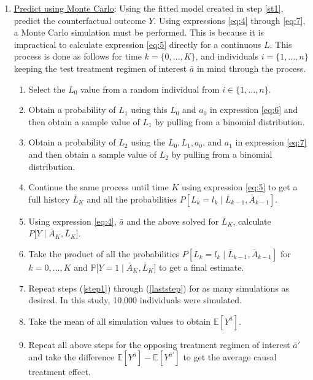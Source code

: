 \begin{enumerate}
\item \underline{Predict using Monte Carlo}: Using the fitted model created in step \ref{st1}, predict the counterfactual outcome $Y$.  Using expressions \ref{eq:4} through \ref{eq:7}, a Monte Carlo simulation must be performed.  This is because it is impractical to calculate expression \ref{eq:5} directly for a continuous $L$.  This process is done as follows for time $k = \{ 0, \dots, K \}$, and individuals $i = \{ 1, \dots, n \}$ keeping the test treatment regimen of interest $\bar{a}$ in mind through the process.  
\begin{enumerate} 
\item Select the $L_0$ value from a random individual from $i \in  \{ 1, \dots, n \}$. \label{step1}  
\item Obtain a probability of $L_1$ using this $L_0$ and $a_0$ in expression \ref{eq:6} and then obtain a sample value of $L_1$ by pulling from a binomial distribution.  
\item Obtain a probability of $L_2$ using the $L_0, L_1, a_0$, and $a_1$ in expression \ref{eq:7} and then obtain a sample value of $L_2$ by pulling from a binomial distribution.  
\item Continue the same process until time $K$ using expression \ref{eq:5} to get a full history $\overline{L}_K$ and all the probabilities $P[L_k = l_k \mid  \overline{L}_{k-1}, \overline{A}_{k-1}]$.  
\item Using expression \ref{eq:4}, $\bar{a}$ and the above solved for $\overline{L}_K$, calculate $P \big[Y \mid \overline{A}_K, \overline{L}_K \big]$.  
\item Take the product of all the probabilities $P[L_k = l_k \mid  \overline{L}_{k-1}, \overline{A}_{k-1}]$ for $k = 0, \dots, K$ and $\mathbb{P} \big[Y = 1 \mid \overline{A}_K, \overline{L}_K \big]$ to get a final estimate.  \label{laststep}
\item Repeat steps (\ref{step1}) through (\ref{laststep}) for as many simulations as desired.  In this study, 10,000 individuals were simulated.    
\item Take the mean of all simulation values to obtain $\mathbb{E}[Y^{\bar{a}}]$.  
\item Repeat all above steps for the opposing treatment regimen of interest $\bar{a}'$ and take the difference $\mathbb{E}[Y^{\bar{a}}] - \mathbb{E}[Y^{\bar{a}'}]$ to get the average causal treatment effect.  
\end{enumerate}
\end{enumerate} 

